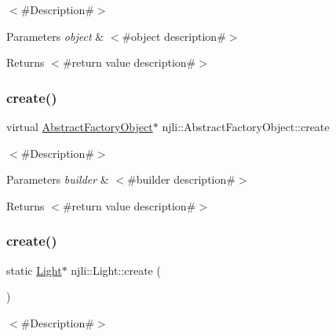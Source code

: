 $<$\#\+Description\#$>$


\begin{DoxyParams}{Parameters}
{\em object} & $<$\#object description\#$>$\\
\hline
\end{DoxyParams}
\begin{DoxyReturn}{Returns}
$<$\#return value description\#$>$ 
\end{DoxyReturn}
\mbox{\label{classnjli_1_1_light_a83a8876ae63b92804004cf3febe76573}} 
\subsubsection{\texorpdfstring{create()}{create()}\hspace{0.1cm}{\footnotesize\ttfamily [1/3]}}
{\footnotesize\ttfamily virtual \mbox{\hyperlink{classnjli_1_1_abstract_factory_object}{Abstract\+Factory\+Object}}$\ast$ njli\+::\+Abstract\+Factory\+Object\+::create}

$<$\#\+Description\#$>$


\begin{DoxyParams}{Parameters}
{\em builder} & $<$\#builder description\#$>$\\
\hline
\end{DoxyParams}
\begin{DoxyReturn}{Returns}
$<$\#return value description\#$>$ 
\end{DoxyReturn}
\mbox{\label{classnjli_1_1_light_a7cebda7210fd52bddcd127d856917567}} 
\subsubsection{\texorpdfstring{create()}{create()}\hspace{0.1cm}{\footnotesize\ttfamily [2/3]}}
{\footnotesize\ttfamily static \mbox{\hyperlink{classnjli_1_1_light}{Light}}$\ast$ njli\+::\+Light\+::create (\begin{DoxyParamCaption}{ }\end{DoxyParamCaption})\hspace{0.3cm}{\ttfamily [static]}}

$<$\#\+Description\#$>$


